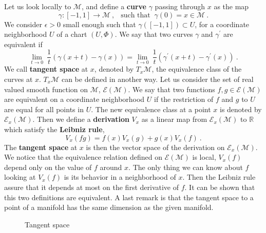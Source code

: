 \documentclass[10pt]{book}
\newcommand{\Ecal}{\mathcal{E}}
\newcommand{\Mcal}{\mathcal{M}}
\newcommand{\Rbb}{\mathbb{R}}
\theoremstyle{break}
\begin{document}
Let us look locally to $\Mcal$, and define a \textbf{curve} $\gamma$ passing through $x$ as the map  
%
\begin{equation*}
\gamma : [-1,1] \to \Mcal \ , \ \ \mbox{ such that } \ \gamma(0) = x \in \Mcal \ .
\end{equation*}
%
We consider $\epsilon > 0$ small enough such that $\gamma([-1,1]) \subset U$, for a coordinate neighborhood $U$ of a chart $(U,\Phi)$. We say that two curves $\gamma$ and $\gamma^\prime$ are equivalent if
%
\begin{equation*}
\underset{t \to 0}{\lim} \ \frac{1}{t} \left( \gamma(x+t) - \gamma(x) \right) = \underset{t \to 0}{\lim} \ \frac{1}{t} \left( \gamma^\prime(x+t) - \gamma^\prime(x) \right) \ .
\end{equation*}
%
We call \textbf{tangent space} at $x$, denoted by $T_x\Mcal$, the equivalence class of the curves at $x$. $T_x\Mcal$ can be defined in another way. Let us consider the set of real valued smooth function on $\Mcal$, $\Ecal(\Mcal)$. We say that two functions $f, g \in \Ecal(\Mcal)$ are equivalent on a coordinate neighborhood $U$ if the restriction of $f$ and $g$ to $U$ are equal for all points in $U$. The new equivalence class at a point $x$ is denoted by $\Ecal_x(\Mcal)$. Then we define a \textbf{derivation} $V_x$ as a linear map from $\Ecal_x(\Mcal)$ to $\Rbb$ which satisfy the \textbf{Leibniz rule},
%
\begin{equation*}
V_x(fg) = f(x) V_x(g) + g(x) V_x(f) \ .
\end{equation*}
%
The \textbf{tangent space} at $x$ is then the vector space of the derivation on $\Ecal_x(\Mcal)$. We notice that the equivalence relation defined on $\Ecal(\Mcal)$ is local, $V_x(f)$ depend only on the value of $f$ around $x$. The only thing we can know about $f$ looking at $V_x(f)$ is its behavior in a neighborhood of $x$. Then the Leibniz rule assure that it depends at most on the first derivative of $f$. It can be shown that this two definitions are equivalent. A last remark is that the tangent space to a point of a manifold has the same dimension as the given manifold.


\begin{figure}[h!]
\begin{center}
\end{center}
\caption{Tangent space}
\end{figure}
\end{document}
